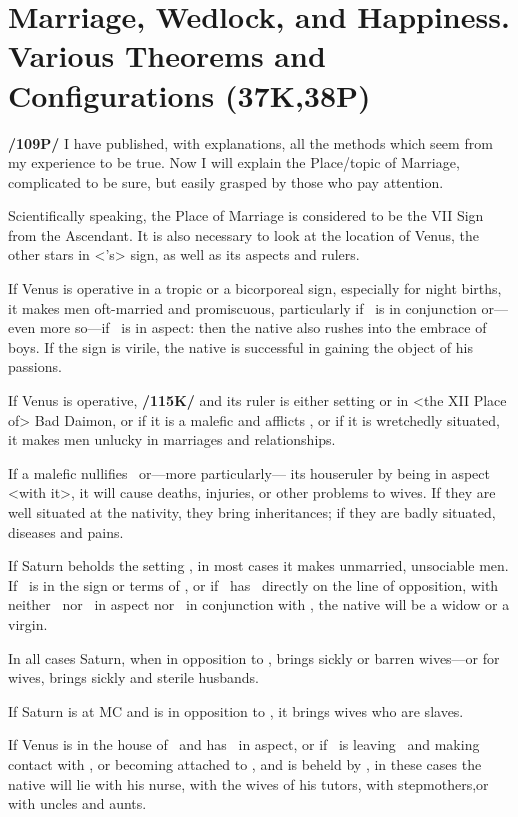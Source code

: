 \section{Marriage, Wedlock, and Happiness. Various Theorems and Configurations (37K,38P)}

\textbf{/109P/} I have published, with explanations, all the methods which seem from my experience to be true. Now
I will explain the Place/topic of Marriage, complicated to be sure, but easily grasped by those who pay attention.

Scientifically speaking, the Place of Marriage is considered to be the VII Sign from the Ascendant. It is also necessary to look at the location of Venus, the other stars in <\Venus’s> sign, as well as its aspects and rulers. 

If Venus is operative in a tropic or a bicorporeal sign, especially for night births, it makes men oft-married and promiscuous, particularly if \Mercury\, is in conjunction or—even more so—if \Mars\, is in aspect: then the native also rushes into the embrace of boys. If the sign is virile, the native is successful in gaining the object of his passions. 

If Venus is operative, \textbf{/115K/} and its ruler is either setting or in <the XII Place of> Bad Daimon, or if it is a malefic and afflicts \Venus, or if it is wretchedly situated, it makes men unlucky in marriages and relationships. 

If a malefic nullifies \Venus\, or—more particularly—
its houseruler by being in aspect <with it>, it will cause deaths, injuries, or other problems to wives. If they are well situated at the nativity, they bring inheritances; if they are badly situated, diseases and pains.

If Saturn beholds the setting \Venus, in most cases it makes unmarried, unsociable men. If \Venus\, is in the sign or terms of \Saturn, or if \Venus\, has \Saturn\, directly on the line of opposition, with neither \Mars\, nor \Jupiter\, in aspect nor \Mercury\, in conjunction with \Venus, the native will be a widow or a virgin. 

In all cases Saturn, when in opposition to \Venus, brings sickly or barren wives—or for wives, brings sickly and
sterile husbands. 

If Saturn is at MC and is in opposition to \Venus, it brings wives who are slaves. 

If Venus is in the house of \Saturn\, and has
 \Jupiter\, in aspect, or if \Venus\, is leaving \Jupiter\, and making contact with \Saturn, or becoming attached to \Saturn, and is beheld by \Mars, in these cases the native will lie with his nurse, with the wives of his tutors, with stepmothers,or with uncles and aunts. 

